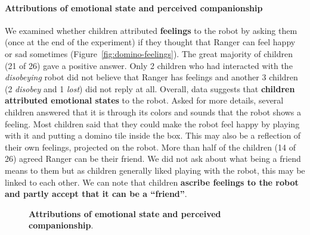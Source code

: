 \documentclass{sig-alternate}
\begin{document}
\paragraph{Attributions of emotional state and perceived companionship}

We examined whether children attributed \textbf{feelings} to the robot by asking
them (once at the end of the experiment) if they thought that Ranger can feel
happy or sad sometimes (Figure~\ref{fig:domino-feelings}). The great majority of
children (21 of 26) gave a positive answer. Only 2 children who had interacted
with the \textit{disobeying} robot did not believe that Ranger has feelings and
another 3 children (2 \textit{disobey} and 1 \textit{lost}) did not reply at
all. Overall, data suggests that \textbf{children attributed emotional states}
to the robot. Asked for more details, several children answered that it is
through its colors and sounds that the robot shows a feeling. Most children said
that they could make the robot feel happy by playing with it and putting a
domino tile inside the box. This may also be a reflection of their own feelings,
projected on the robot.  More than half of the children (14 of 26) agreed Ranger
can be their friend. We did not ask about what being a friend means to them but
as children generally liked playing with the robot, this may be linked to each
other. We can note that children \textbf{ascribe feelings to the robot and
partly accept that it can be a ``friend''}.

\begin{figure}[!h]
    \centering
    \caption[Attribution of Emotional State and Perceived Companionship]{\small
    \textbf{Attributions of emotional state and perceived companionship}.}

    \label{fig:domino-feelings-companion}
\end{figure}
\end{document}
